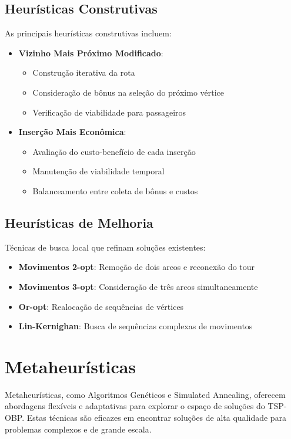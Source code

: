 \documentclass[12pt, a4paper]{report}
\begin{document}
\subsection{Heurísticas Construtivas}
As principais heurísticas construtivas incluem:

\begin{itemize}
    \item \textbf{Vizinho Mais Próximo Modificado}: 
    \begin{itemize}
        \item Construção iterativa da rota
        \item Consideração de bônus na seleção do próximo vértice
        \item Verificação de viabilidade para passageiros
    \end{itemize}
    
    \item \textbf{Inserção Mais Econômica}:
    \begin{itemize}
        \item Avaliação do custo-benefício de cada inserção
        \item Manutenção de viabilidade temporal
        \item Balanceamento entre coleta de bônus e custos
    \end{itemize}
\end{itemize}

\subsection{Heurísticas de Melhoria}
Técnicas de busca local que refinam soluções existentes:

\begin{itemize}
    \item \textbf{Movimentos 2-opt}: Remoção de dois arcos e reconexão do tour
    \item \textbf{Movimentos 3-opt}: Consideração de três arcos simultaneamente
    \item \textbf{Or-opt}: Realocação de sequências de vértices
    \item \textbf{Lin-Kernighan}: Busca de sequências complexas de movimentos
\end{itemize}

\section{Metaheurísticas}
Metaheurísticas, como Algoritmos Genéticos e Simulated Annealing, oferecem abordagens flexíveis e adaptativas para explorar o espaço de soluções do TSP-OBP. Estas técnicas são eficazes em encontrar soluções de alta qualidade para problemas complexos e de grande escala.
\end{document}
